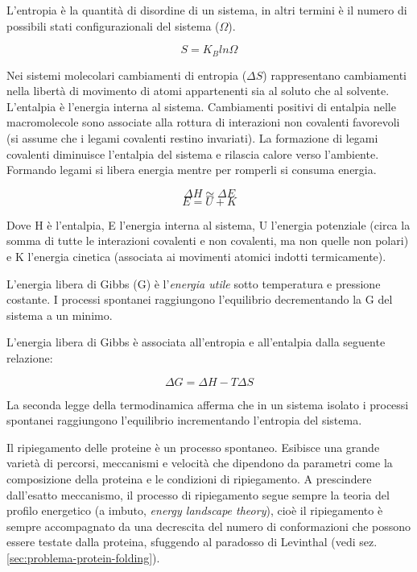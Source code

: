 {{\par L'entropia è la quantità di disordine di un sistema, in altri termini è il numero di possibili stati configurazionali del sistema ($\Omega$). 

\[ S = K_{B}ln{\Omega} \]

Nei sistemi molecolari cambiamenti di entropia ($\Delta S$) rappresentano cambiamenti nella libertà di movimento di atomi appartenenti sia al soluto che al solvente.  L'entalpia è l'energia interna al sistema. Cambiamenti positivi di entalpia nelle macromolecole sono associate alla rottura di interazioni non covalenti favorevoli (si assume che i legami covalenti restino invariati). La formazione di legami covalenti diminuisce l'entalpia del sistema e rilascia calore verso l'ambiente. Formando legami si libera energia mentre per romperli si consuma energia.

\[ \Delta H \simeq \Delta E \] 
\[ E = U + K \]

Dove H è l'entalpia, E l'energia interna al sistema, U l'energia potenziale (circa la somma di tutte le interazioni covalenti e non covalenti, ma non quelle non polari) e K l'energia cinetica (associata ai movimenti atomici indotti termicamente).\\

\par L'energia libera di Gibbs (G) è l'\textit{energia utile} sotto temperatura e pressione costante. I processi spontanei raggiungono l'equilibrio decrementando la G del sistema a un minimo.

L'energia libera di Gibbs è associata all'entropia e all'entalpia dalla seguente relazione:

\[ \Delta G = \Delta H - T \Delta S \]

\par La seconda legge della termodinamica afferma che in un sistema isolato i processi spontanei raggiungono l'equilibrio incrementando l'entropia del sistema. 

\par Il ripiegamento delle proteine è un processo spontaneo. Esibisce una grande varietà di percorsi, meccanismi e velocità che dipendono da parametri come la composizione della proteina e le condizioni di ripiegamento. A prescindere dall'esatto meccanismo, il processo di ripiegamento segue sempre la teoria del profilo energetico (a imbuto, \textit{energy landscape theory}), cioè il ripiegamento è sempre accompagnato da una decrescita del numero di conformazioni che possono essere testate dalla proteina, sfuggendo al paradosso di Levinthal (vedi sez. \ref{sec:problema-protein-folding}).

}}
